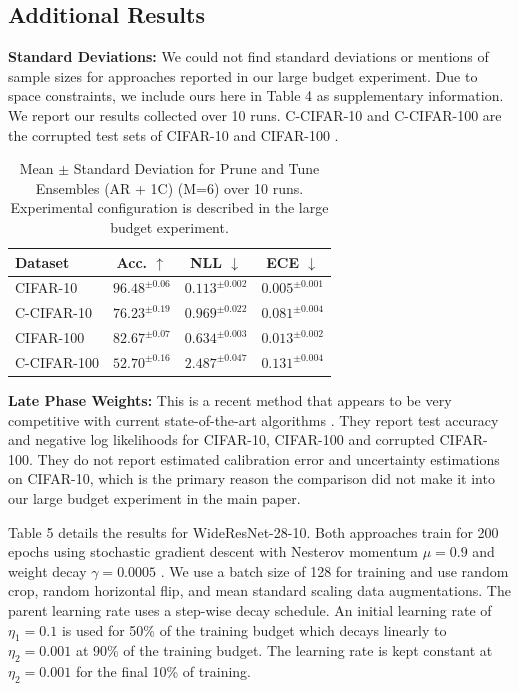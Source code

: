 \documentclass[letterpaper]{article} %
\begin{document}
\subsection{Additional Results}

{\bf Standard Deviations:} We could not find standard deviations or mentions of sample sizes for approaches reported in our large budget experiment. Due to space constraints, we include ours here in Table 4 as supplementary information. We report our results collected over 10 runs. C-CIFAR-10 and C-CIFAR-100 are the corrupted test sets of CIFAR-10 and CIFAR-100 \cite{hendrycks2019robustness}.

\begin{table}
\small
\begin{tabularx}{\columnwidth}{X c c c}
\toprule
Dataset & Acc. $\uparrow$ & NLL $\downarrow$ & ECE $\downarrow$ \\
\midrule
CIFAR-10 & $96.48^{\pm 0.06}$ & $0.113^{\pm 0.002}$ & $0.005^{\pm 0.001}$  \\
C-CIFAR-10 & $76.23^{\pm 0.19}$ & $0.969^{\pm 0.022}$ & $0.081^{\pm 0.004}$  \\
CIFAR-100 & $82.67^{\pm 0.07}$ & $0.634^{\pm 0.003}$ & $0.013^{\pm 0.002}$  \\
C-CIFAR-100 & $52.70^{\pm 0.16}$ & $2.487^{\pm 0.047}$ & $0.131^{\pm 0.004}$  \\
\bottomrule
\end{tabularx}
\caption{Mean $\pm$ Standard Deviation for Prune and Tune Ensembles (AR + 1C) (M=6) over 10 runs. Experimental configuration is described in the large budget experiment.}
\end{table}


{\bf Late Phase Weights:} This is a recent method that appears to be very competitive with current state-of-the-art algorithms \cite{vonoswald2021neural}. They report test accuracy and negative log likelihoods for CIFAR-10, CIFAR-100 and corrupted CIFAR-100. They do not report estimated calibration error and uncertainty estimations on CIFAR-10, which is the primary reason the comparison did not make it into our large budget experiment in the main paper.

Table 5 details the results for WideResNet-28-10. Both approaches train for 200 epochs using stochastic gradient descent with Nesterov momentum $\mu=0.9$ and weight decay $\gamma=0.0005$ \cite{sutskever13nesterov}. We use a batch size of 128 for training and use random crop, random horizontal flip, and mean standard scaling data augmentations. The parent learning rate uses a step-wise decay schedule. An initial learning rate of $\eta_1=0.1$ is used for 50\% of the training budget which decays linearly to $\eta_2=0.001$ at 90\% of the training budget. The learning rate is kept constant at $\eta_2=0.001$ for the final 10\% of training.
\end{document}
